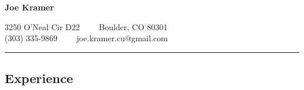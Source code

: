 \documentclass[11pt,letterpaper]{article}
\begin{document}
\begin{center}
{\LARGE \textbf{Joe Kramer}}

\vspace{0.8em}

3250 O'Neal Cir D22\ \ \textbullet
\ \ Boulder, CO 80301
\\
(303) 335-9869\ \ \textbullet
\ \ joe.kramer.cu@gmail.com
\end{center}


\vspace{0.8em}
\hrule
\vspace{-0.4em}
\subsection*{Experience}
\end{document}
